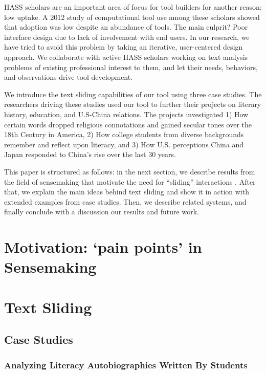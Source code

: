 \documentclass{sig-alternate}
\begin{document}
HASS scholars are an important area of focus for tool builders for another reason: low uptake. A 2012 study of computational tool use among these scholars showed that adoption was low despite an abundance of tools. The main culprit? Poor interface design due to lack of involvement with end users. In our research, we have tried to avoid this problem by taking an iterative, user-centered design approach. We collaborate with active HASS scholars working on text analysis problems of existing professional interest to them, and let their needs, behaviors, and observations drive tool development.

We introduce the text sliding capabilities of our tool using three case studies. The researchers driving these studies used our tool to further their projects on literary history, education, and U.S-China relations. The projects investigated 1) How certain words dropped religious connotations and gained secular tones over the 18th Century in America, 2) How college students from diverse backgrounds remember and reflect upon literacy, and 3) How U.S. perceptions China and Japan responded to China's rise over the last 30 years.

This paper is structured as follows: in the next section, we describe results from the field of sensemaking that motivate the need for ``sliding'' interactions . After that, we explain the main ideas behind text sliding and show it in action with extended examples from case studies. Then, we describe related systems, and finally conclude with a discussion our results and future work.

\section{Motivation: `pain points' in Sensemaking}

\section{Text Sliding}


\subsection{Case Studies}

\subsubsection{Analyzing Literacy Autobiographies Written By Students}
\end{document}
